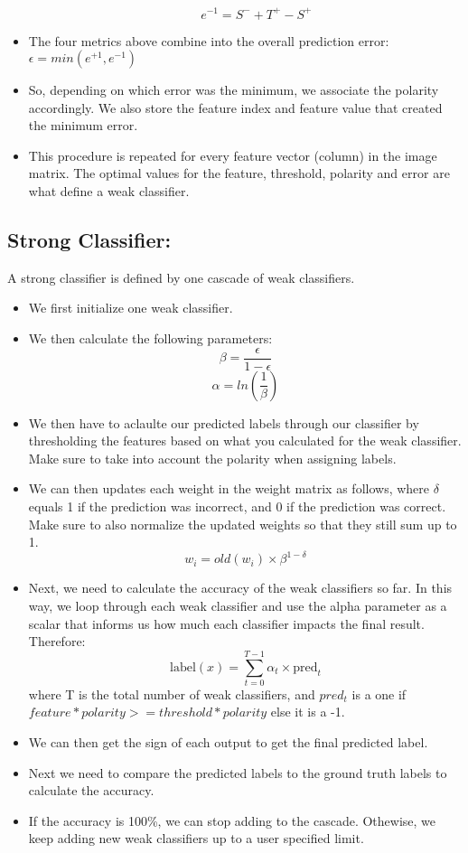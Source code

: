 \documentclass{article}
\begin{document}
\begin{itemize}
\begin{itemize}
                \[ e^{-1} = S^- + T^+ - S^+ \]
        \end{itemize}
    \item The four metrics above combine into the overall prediction error: $\epsilon = min\left(e^{+1}, e^{-1}\right)$
    \item So, depending on which error was the minimum, we associate the polarity accordingly. We also store the feature index and feature value that created the minimum error.
    \item This procedure is repeated for every feature vector (column) in the image matrix. The optimal values for the feature, threshold, polarity and error are what define a weak classifier.
\end{itemize}

\subsection{Strong Classifier: }
A strong classifier is defined by one cascade of weak classifiers. 
\begin{itemize}
    \item We first initialize one weak classifier. 
    \item We then calculate the following parameters:
        \[\beta = \frac{\epsilon}{1 - \epsilon} \]
        \[ \alpha = ln \left(\frac{1}{\beta} \right) \]
    \item We then have to aclaulte our predicted labels through our classifier by thresholding the features based on what you calculated for the weak classifier. Make sure to take into account the polarity when assigning labels.
    \item We can then updates each weight in the weight matrix as follows, where $\delta$ equals 1 if the prediction was incorrect, and 0 if the prediction was correct. Make sure to also normalize the updated weights so that they still sum up to 1.
        \[ w_i = old\left(w_i\right) \times \beta^{1 - \delta} \] 
    \item Next, we need to calculate the accuracy of the weak classifiers so far. In this way, we loop through each weak classifier and use the alpha parameter as a scalar that informs us how much each classifier impacts the final result. Therefore:
        \[ \text{label} (x) = \sum_{t=0}^{T-1} \alpha_t \times \text{pred}_t\]
        where T is the total number of weak classifiers, and $pred_t$ is a one if $feature * polarity >= threshold * polarity$ else it is a -1.
    \item We can then get the sign of each output to get the final predicted label.
    \item Next we need to compare the predicted labels to the ground truth labels to calculate the accuracy.
    \item If the accuracy is 100\%, we can stop adding to the cascade. Othewise, we keep adding new weak classifiers up to a user specified limit.
\end{itemize}
\end{document}
